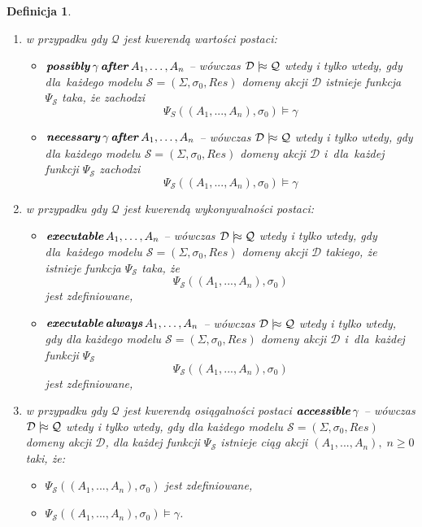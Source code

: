 \documentclass[11pt,a4paper]{article}
\newtheorem{defn}{Definicja}
\DeclareMathOperator{\After}{\textbf{\textit{after}}}
\DeclareMathOperator{\Always}{\textbf{\textit{always}}}
\DeclareMathOperator{\Executable}{\textbf{\textit{executable}}}
\DeclareMathOperator{\Accessible}{\textbf{\textit{accessible}}}
\DeclareMathOperator{\Possibly}{\textbf{\textit{possibly}}}
\DeclareMathOperator{\Necessary}{\textbf{\textit{necessary}}}
\def\consequence{\mathrel|\joinrel\approx}
\begin{document}
\begin{defn}
    \begin{enumerate}
        \item w przypadku gdy $\mathcal{Q}$ jest kwerendą wartości postaci:
        \begin{itemize}
            \item $\Possibly \gamma \After A_1, \dots, A_n$ -- wówczas $\mathcal{D} \consequence \mathcal{Q}$ wtedy i tylko wtedy, gdy dla~każdego modelu %
            $\mathcal{S} = (\Sigma,\sigma_0,Res)$ domeny akcji $\mathcal{D}$ istnieje funkcja $\Psi_\mathcal{S}$ taka, że zachodzi $$\Psi_S((A_1,...,A_n),\sigma_{0}) \models \gamma$$
            \item $\Necessary \gamma \After A_1, \dots, A_n$ -- wówczas $\mathcal{D} \consequence \mathcal{Q}$ wtedy i tylko wtedy, gdy dla każdego modelu %
            $\mathcal{S} = (\Sigma,\sigma_0,Res)$ domeny akcji $\mathcal{D}$ i~dla~każdej funkcji $\Psi_\mathcal{S}$ zachodzi $$\Psi_\mathcal{S}((A_1,...,A_n),\sigma_{0}) \models \gamma$$
        \end{itemize}
        \item w przypadku gdy $\mathcal{Q}$ jest kwerendą wykonywalności postaci:
        \begin{itemize}
            \item $\Executable A_1, \dots, A_n$ -- wówczas $\mathcal{D} \consequence \mathcal{Q}$ wtedy i tylko wtedy, gdy dla~każdego modelu %
            $\mathcal{S} = (\Sigma,\sigma_0,Res)$ domeny akcji $\mathcal{D}$ takiego, że istnieje %
            funkcja $\Psi_\mathcal{S}$ taka, że
            $$\Psi_\mathcal{S}((A_1,...,A_n),\sigma_{0})$$
            jest zdefiniowane,
            \item $\Executable \Always A_1, \dots, A_n$ -- wówczas $\mathcal{D} \consequence \mathcal{Q}$ wtedy i tylko wtedy, gdy dla każdego modelu %
            $\mathcal{S} = (\Sigma,\sigma_0,Res)$ domeny akcji $\mathcal{D}$ i~dla~każdej funkcji $\Psi_\mathcal{S}$
            $$\Psi_\mathcal{S}((A_1,...,A_n),\sigma_{0})$$
            jest zdefiniowane,
        \end{itemize}
        \item w przypadku gdy $\mathcal{Q}$ jest kwerendą osiągalności postaci $\Accessible \gamma$ -- wówczas $\mathcal{D} \consequence \mathcal{Q}$ wtedy i tylko wtedy, gdy dla każdego modelu $\mathcal{S} = (\Sigma,\sigma_0,Res)$ domeny akcji $\mathcal{D}$, dla każdej funkcji $\Psi_\mathcal{S}$ istnieje ciąg akcji $(A_1,...,A_n), \; n \geq 0$ taki, że:
        \begin{itemize}
            \item $\Psi_\mathcal{S}((A_1,...,A_n),\sigma_{0})$ jest zdefiniowane,
            \item $\Psi_\mathcal{S}((A_1,...,A_n),\sigma_{0}) \models \gamma$.
        \end{itemize}
    \end{enumerate}
\end{defn}
\end{document}
